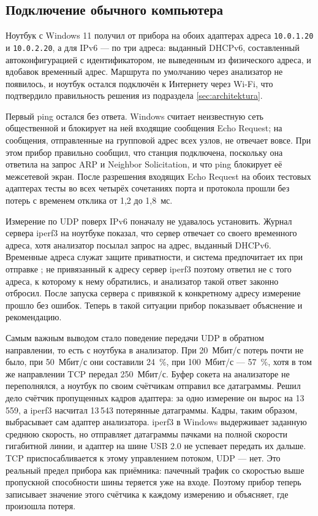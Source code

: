 \subsection{Подключение обычного компьютера}
\label{sec:overeni_notebook}

Ноутбук с Windows 11 получил от прибора на обоих адаптерах адреса \texttt{10.0.1.20} и \texttt{10.0.2.20}, а для IPv6 — по три адреса: выданный DHCPv6, составленный автоконфигурацией с идентификатором, не выведенным из физического адреса, и вдобавок временный адрес. Маршрута по умолчанию через анализатор не появилось, и ноутбук остался подключён к Интернету через Wi-Fi, что подтвердило правильность решения из подраздела \ref{sec:architektura}.

Первый ping остался без ответа. Windows считает неизвестную сеть общественной и блокирует на ней входящие сообщения Echo Request; на сообщения, отправленные на групповой адрес всех узлов, не отвечает вовсе. При этом прибор правильно сообщил, что станция подключена, поскольку она ответила на запрос ARP и Neighbor Solicitation, и что ping блокирует её межсетевой экран. После разрешения входящих Echo Request на обоих тестовых адаптерах тесты во всех четырёх сочетаниях порта и протокола прошли без потерь с временем отклика от 1,2 до 1,8~мс.

Измерение по UDP поверх IPv6 поначалу не удавалось установить. Журнал сервера iperf3 на ноутбуке показал, что сервер отвечает со своего временного адреса, хотя анализатор посылал запрос на адрес, выданный DHCPv6. Временные адреса служат защите приватности, и система предпочитает их при отправке \cite{rfc8981}; не привязанный к адресу сервер iperf3 поэтому ответил не с того адреса, к которому к нему обратились, и анализатор такой ответ законно отбросил. После запуска сервера с привязкой к конкретному адресу измерение прошло без ошибок. Теперь в такой ситуации прибор показывает объяснение и рекомендацию.

Самым важным выводом стало поведение передачи UDP в обратном направлении, то есть с ноутбука в анализатор. При 20~Мбит/с потерь почти не было, при 50~Мбит/с они составили 24~\%, при 100~Мбит/с — 57~\%, хотя в том же направлении TCP передал 250~Мбит/с. Буфер сокета на анализаторе не переполнялся, а ноутбук по своим счётчикам отправил все датаграммы. Решил дело счётчик пропущенных кадров адаптера: за одно измерение он вырос на 13\,559, а iperf3 насчитал 13\,543 потерянные датаграммы. Кадры, таким образом, выбрасывает сам адаптер анализатора. iperf3 в Windows выдерживает заданную среднюю скорость, но отправляет датаграммы пачками на полной скорости гигабитной линии, и адаптер на шине USB 2.0 не успевает передать их дальше. TCP приспосабливается к этому управлением потоком, UDP — нет. Это реальный предел прибора как приёмника: пачечный трафик со скоростью выше пропускной способности шины теряется уже на входе. Поэтому прибор теперь записывает значение этого счётчика к каждому измерению и объясняет, где произошла потеря.

